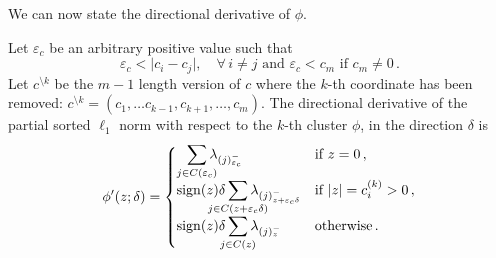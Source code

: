 
We can now state the directional derivative of $\phi$. %

\begin{theorem}\label{thm:sl1-directional-derivative}
  Let $\varepsilon_c$ be an arbitrary positive value such that
  \begin{equation}
    \label{eq:epsilon-c}
    \varepsilon_c < \big| c_i - c_j\big| , \quad \forall\, i \neq j \text{ and } \varepsilon_c < c_m \text{ if } c_m \neq 0 \, .
  \end{equation}
  Let \(c^{\setminus k}\) be the \(m - 1\) length version of $c$ where the $k$-th coordinate has been removed: $c^{\setminus k} = (c_1, \ldots c_{k-1}, c_{k+1}, \ldots, c_m)$.
  The directional derivative of the partial sorted $\ell_1$ norm with respect to the $k$-th cluster \(\phi\), in the direction \(\delta\) is
  \[
    \phi'(z; \delta) =
    \begin{cases}
      \smashoperator[r]{\sum_{j \in C(\varepsilon_c )}} \lambda_{(j)^-_{\varepsilon_c }}
       & \text{if } z = 0 \, ,               \\
      \sign(z)\delta\smashoperator{\sum_{j \in C(z + {\varepsilon_c} \delta)}} \lambda_{(j)^-_{z + {\varepsilon_c}\delta}}
       & \text{if } |z| = c^{(k)}_i > 0 \, , \\
      \sign(z)\delta\smashoperator{\sum_{j \in C(z)}} \lambda_{(j)^-_{z}}
       & \text{otherwise} \, .
    \end{cases}
  \]
\end{theorem}

